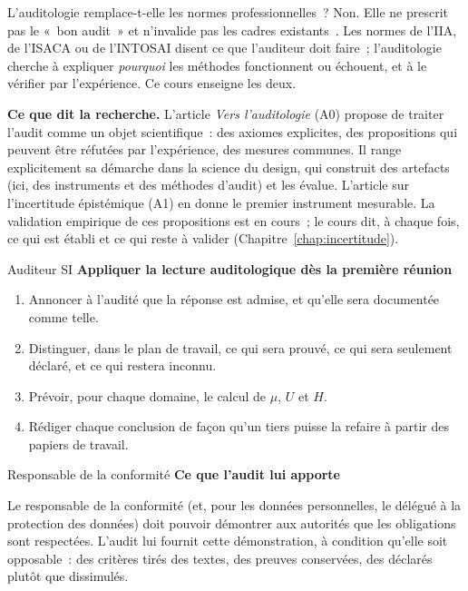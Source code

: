 \begin{boiteRemarque}{L'auditologie remplace-t-elle les normes professionnelles~?}
Non. Elle ne prescrit pas le «~bon audit~» et n'invalide pas les cadres
existants~\cite{minka2026auditologie}. Les normes de l'IIA, de l'ISACA ou de
l'INTOSAI disent ce que l'auditeur doit faire~; l'auditologie cherche à
expliquer \emph{pourquoi} les méthodes fonctionnent ou échouent, et à le
vérifier par l'expérience. Ce cours enseigne les deux.
\end{boiteRemarque}

\begin{boxinfo}
\textbf{Ce que dit la recherche.} L'article \emph{Vers l'auditologie} (A0)
propose de traiter l'audit comme un objet scientifique~: des axiomes
explicites, des propositions qui peuvent être réfutées par l'expérience,
des mesures communes. Il range explicitement sa démarche dans la science du
design, qui construit des artefacts (ici, des instruments et des méthodes
d'audit) et les évalue. L'article sur l'incertitude épistémique (A1) en
donne le premier instrument mesurable. La validation empirique de ces
propositions est en cours~; le cours dit, à chaque fois, ce qui est établi
et ce qui reste à valider (Chapitre~\ref{chap:incertitude}).
\end{boxinfo}

\begin{boxmetier}{Auditeur SI}
\textbf{Appliquer la lecture auditologique dès la première réunion}
\begin{enumerate}
    \item Annoncer à l'audité que la réponse \NEK{} est admise, et qu'elle
          sera documentée comme telle.
    \item Distinguer, dans le plan de travail, ce qui sera prouvé, ce qui
          sera seulement déclaré, et ce qui restera inconnu.
    \item Prévoir, pour chaque domaine, le calcul de $\mu$, $U$ et $H$.
    \item Rédiger chaque conclusion de façon qu'un tiers puisse la refaire à
          partir des papiers de travail.
\end{enumerate}
\end{boxmetier}

\begin{boxmetier}{Responsable de la conformité}
\textbf{Ce que l'audit lui apporte}

Le responsable de la conformité (et, pour les données personnelles, le
délégué à la protection des données) doit pouvoir démontrer aux autorités
que les obligations sont respectées. L'audit lui fournit cette
démonstration, à condition qu'elle soit opposable~: des critères tirés des
textes, des preuves conservées, des \NEK{} déclarés plutôt que dissimulés.
\end{boxmetier}

